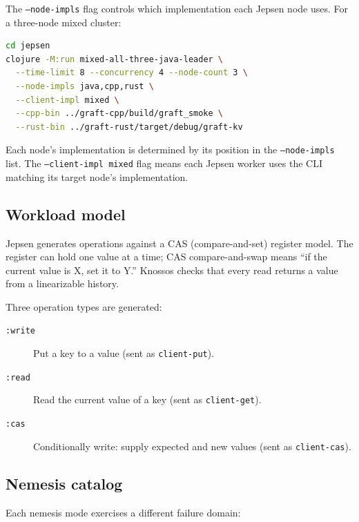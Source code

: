 The \texttt{--node-impls} flag controls which implementation each Jepsen node
uses. For a three-node mixed cluster:

\begin{lstlisting}[language=bash,caption={Mixed Jepsen run}]
cd jepsen
clojure -M:run mixed-all-three-java-leader \
  --time-limit 8 --concurrency 4 --node-count 3 \
  --node-impls java,cpp,rust \
  --client-impl mixed \
  --cpp-bin ../graft-cpp/build/graft_smoke \
  --rust-bin ../graft-rust/target/debug/graft-kv
\end{lstlisting}

Each node's implementation is determined by its position in the
\texttt{--node-impls} list. The \texttt{--client-impl mixed} flag means each
Jepsen worker uses the CLI matching its target node's implementation.

\subsection{Workload model}

Jepsen generates operations against a CAS (compare-and-set) register model.
The register can hold one value at a time; CAS compare-and-swap means
``if the current value is X, set it to Y.'' Knossos checks that every
read returns a value from a linearizable history.

Three operation types are generated:

\begin{description}
\item[\texttt{:write}] Put a key to a value (sent as \texttt{client-put}).
\item[\texttt{:read}] Read the current value of a key (sent as \texttt{client-get}).
\item[\texttt{:cas}] Conditionally write: supply expected and new values
(sent as \texttt{client-cas}).
\end{description}

\subsection{Nemesis catalog}

Each nemesis mode exercises a different failure domain:

